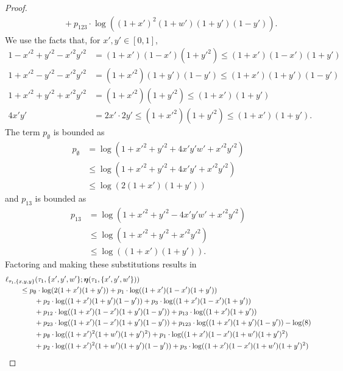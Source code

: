 \begin{proof}
\begin{align}
    &\qquad + p_{123}        \cdot\log((1+x')^2   (1+w')(1+y')(1-y')).
\end{align}
We use the facts that, for $x',y'\in[0,1]$,
\begin{align*}
1-x'^2+y'^2-x'^2y'^2 & = (1+x')(1-x')(1+y'^2) \le (1+x')(1-x')(1+y') \\
1+x'^2-y'^2-x'^2y'^2 & = (1+x'^2)(1+y')(1-y') \le (1+x')(1+y')(1-y') \\
1+x'^2+y'^2+x'^2y'^2 & = (1+x'^2)(1+y'^2) \le (1+x')(1+y') \\
4x'y' & = 2x' \cdot 2y' \le (1+x'^2)(1+y'^2) \le (1+x')(1+y').
\end{align*}
The term $p_{\emptyset}$ is bounded as
\begin{align*}
    p_{\emptyset} & = \log(1+x'^2+y'^2+4x'y'w'+x'^2y'^2) \\
                  & \le \log(1+x'^2+y'^2+4x'y'+x'^2y'^2) \\
                  & \le \log(2(1+x')(1+y'))
\end{align*}
and $p_{13}$ is bounded as
\begin{align*}
    p_{13} & = \log(1+x'^2+y'^2-4x'y'w'+x'^2y'^2) \\
                  & \le \log(1+x'^2+y'^2+x'^2y'^2) \\
                  & \le \log((1+x')(1+y')).
\end{align*}
Factoring and making these substitutions results in
\begin{align*}
&    \ell_{\tau_1,\{x,y,y\}}(\tau_1, \{x',y',w'\}; \fullAncestralSplitPartitions(\tau_1,\{x',y',w'\})) \\
&\qquad \le      p_{\emptyset}  \cdot\log(2(1+x')(1+y'))
+ p_{1}          \cdot\log((1+x')(1-x')(1+y')) \\
    &\qquad\qquad + p_{2}          \cdot\log((1+x')(1+y')(1-y'))
+ p_{3}          \cdot\log((1+x')(1-x')(1+y')) \\
    &\qquad\qquad + p_{12}         \cdot\log((1+x')(1-x')(1+y')(1-y'))
+ p_{13}         \cdot\log((1+x')(1+y')) \\
    &\qquad\qquad + p_{23}         \cdot\log((1+x')(1-x')(1+y')(1-y'))
+ p_{123}        \cdot\log((1+x')(1+y')(1-y'))
- \log(8) \\
    &\qquad\qquad + p_{\emptyset}  \cdot\log((1+x')^2   (1+w')(1+y')^2)
+ p_{1}          \cdot\log((1+x')(1-x')(1+w')(1+y')^2) \\
    &\qquad\qquad + p_{2}          \cdot\log((1+x')^2   (1+w')(1+y')(1-y'))
+ p_{3}          \cdot\log((1+x')(1-x')(1+w')(1+y')^2) \\

\end{align*}
\end{proof}
